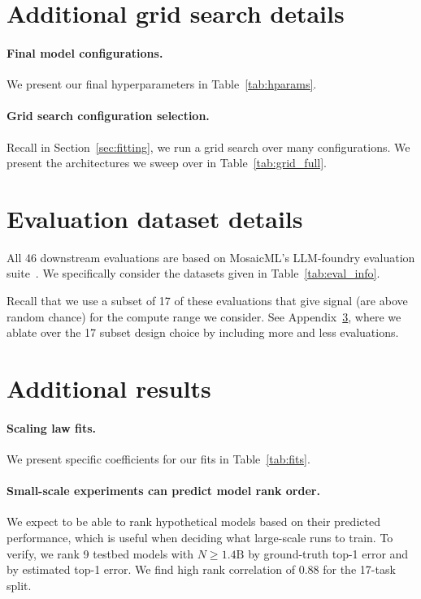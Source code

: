 \begin{appendix}
\section{Additional grid search details}
\label{appx:additional_training}

\paragraph{Final model configurations.}
We present our final hyperparameters in Table~\ref{tab:hparams}.


\paragraph{Grid search configuration selection.}
Recall in Section~\ref{sec:fitting}, we run a grid search over many configurations.
We present the architectures we sweep over in Table~\ref{tab:grid_full}.


\section{Evaluation dataset details}
\label{appx:eval_data}

All 46 downstream evaluations are based on MosaicML's LLM-foundry evaluation suite~\cite{mosaicml}.
We specifically consider the datasets given in Table~\ref{tab:eval_info}.

Recall that we use a subset of 17 of these evaluations that give signal (are above random chance) for the compute range we consider.
See Appendix~\ref{appx:more_results}, where we ablate over the 17 subset design choice by including more and less evaluations.


\section{Additional results}
\label{appx:more_results}

\paragraph{Scaling law fits.}
We present specific coefficients for our fits in Table~\ref{tab:fits}.



\paragraph{Small-scale experiments can predict model rank order.}
We expect to be able to rank hypothetical models based on their predicted performance, which is useful when deciding what large-scale runs to train.
To verify, we rank 9 testbed models with $N\geq1.4\text{B}$ by ground-truth top-1 error and by estimated top-1 error.
We find high rank correlation of 0.88 for the 17-task split.


\end{appendix}
